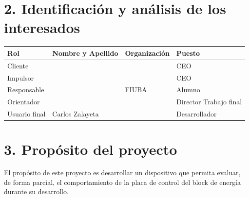\documentclass[
11pt, %
codirector, %
]{charter}
\begin{document}
\section{2. Identificación y análisis de los interesados}
\label{sec:interesados}

\begin{table}[ht]
	\begin{tabularx}{\linewidth}{@{}|l|X|X|l|@{}}
		\hline
		\rowcolor[HTML]{C0C0C0}
		Rol           & Nombre y Apellido & Organización    & Puesto                 \\ \hline
		Cliente       & \clientename      & \empclientename & CEO                    \\ \hline
		Impulsor      & \clientename      & \empclientename & CEO                    \\ \hline
		Responsable   & \authorname       & FIUBA           & Alumno                 \\ \hline
		Orientador    & \supname          & \pertesupname   & Director Trabajo final \\ \hline
		Usuario final & Carlos Zalayeta   & \empclientename & Desarrollador          \\ \hline
	\end{tabularx}
\end{table}



\section{3. Propósito del proyecto}
\label{sec:proposito}

El propósito de este proyecto es desarrollar un dispositivo que permita evaluar, de forma parcial, el comportamiento de la placa de control del block de energía durante su desarrollo.
\end{document}
